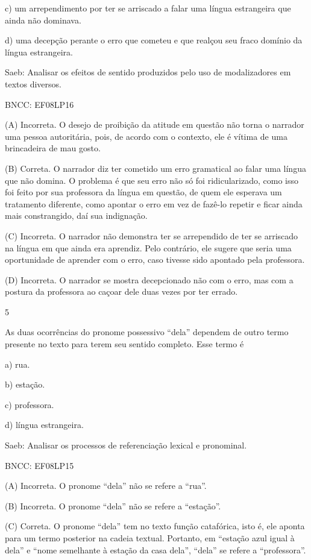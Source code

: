 c) um arrependimento por ter se arriscado a falar uma língua estrangeira
que ainda não dominava.

d) uma decepção perante o erro que cometeu e que realçou seu fraco
domínio da língua estrangeira.

Saeb: Analisar os efeitos de sentido produzidos pelo uso de
modalizadores em textos diversos.

BNCC: EF08LP16

(A) Incorreta. O desejo de proibição da atitude em questão não torna o
narrador uma pessoa autoritária, pois, de acordo com o contexto, ele é
vítima de uma brincadeira de mau gosto.

(B) Correta. O narrador diz ter cometido um erro gramatical ao falar uma
língua que não domina. O problema é que seu erro não só foi
ridicularizado, como isso foi feito por sua professora da língua em
questão, de quem ele esperava um tratamento diferente, como apontar o
erro em vez de fazê-lo repetir e ficar ainda mais constrangido, daí sua
indignação.

(C) Incorreta. O narrador não demonstra ter se arrependido de ter se
arriscado na língua em que ainda era aprendiz. Pelo contrário, ele
sugere que seria uma oportunidade de aprender com o erro, caso tivesse
sido apontado pela professora.

(D) Incorreta. O narrador se mostra decepcionado não com o erro, mas com
a postura da professora ao caçoar dele duas vezes por ter errado.

\num{5}

As duas ocorrências do pronome possessivo ``dela'' dependem de outro
termo presente no texto para terem seu sentido completo. Esse termo é

a) rua.

b) estação.

c) professora.

d) língua estrangeira.

Saeb: Analisar os processos de referenciação lexical e pronominal.

BNCC: EF08LP15

(A) Incorreta. O pronome ``dela'' não se refere a ``rua''.

(B) Incorreta. O pronome ``dela'' não se refere a ``estação''.

(C) Correta. O pronome ``dela'' tem no texto função catafórica, isto é,
ele aponta para um termo posterior na cadeia textual. Portanto, em
``estação azul igual à dela'' e ``nome semelhante à estação da casa
dela'', ``dela'' se refere a ``professora''.

